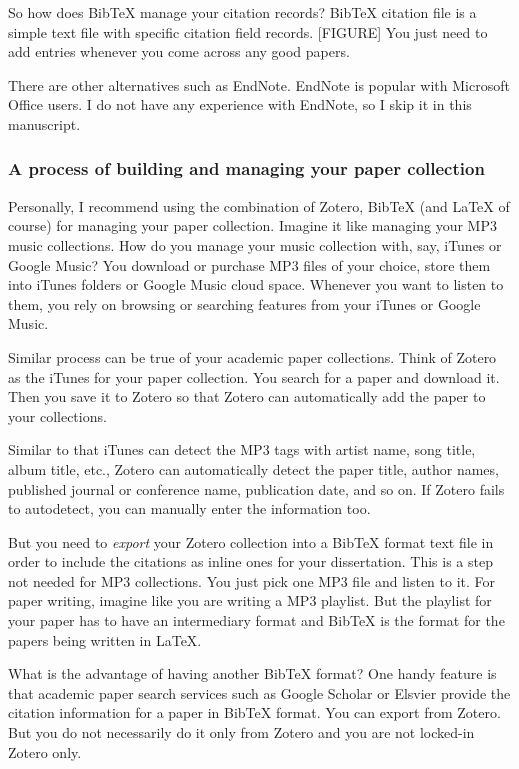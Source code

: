 \documentclass[11pt]{article}
\begin{document}
So how does BibTeX manage your citation records? BibTeX citation file is a
simple text file with specific citation field records. [FIGURE] You just need
to add entries whenever you come across any good papers. 

There are other alternatives such as EndNote. EndNote is popular with
Microsoft Office users. I do not have any experience with EndNote, so I skip
it in this manuscript. 

\subsubsection{A process of building and managing your paper collection}
Personally, I recommend using the combination of Zotero, BibTeX (and
LaTeX of course) for managing your paper collection. Imagine it like
managing your MP3 music collections. How do you manage your music
collection with, say, iTunes or Google Music? You download or purchase
MP3 files of your choice, store them into iTunes folders or Google Music
cloud space. Whenever you want to listen to them, you rely on browsing or
searching features from your iTunes or Google Music.

Similar process can be true of your academic paper collections. Think of
Zotero as the iTunes for your paper collection. You search for a paper and
download it. Then you save it to Zotero so that Zotero can automatically add
the paper to your collections. 

Similar to that iTunes can detect the MP3 tags with artist name, song
title, album title, etc., Zotero can automatically detect the paper
title, author names, published journal or conference name, publication
date, and so on. If Zotero fails to autodetect, you can manually enter
the information too.

But you need to \emph{export} your Zotero collection into a BibTeX format
text file in order to include the citations as inline ones for your
dissertation. This is a step not needed for MP3 collections. You just pick one
MP3 file and listen to it. For paper writing, imagine like you are writing a
MP3 playlist. But the playlist for your paper has to have an intermediary
format and BibTeX is the format for the papers being written in LaTeX.

What is the advantage of having another BibTeX format? One handy feature is
that academic paper search services such as Google Scholar or Elsvier provide
the citation information for a paper in BibTeX format. You can export from
Zotero. But you do not necessarily do it only from Zotero and you are not
locked-in Zotero only. 
\end{document}
